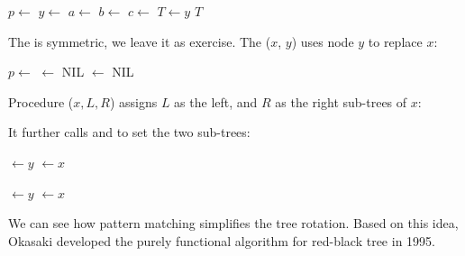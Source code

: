 \documentclass[b5paper]{article}
\begin{document}
\begin{algorithmic}[1]
  \State $p \gets$ 
  \State $y \gets$  
  \State $a \gets$ 
  \State $b \gets$ 
  \State $c \gets$ 
  \State {}  
  \State {} 
  \State {} 
    
    \State $T \gets y$
  \EndIf
  \State \Return $T$
\EndFunction
\end{algorithmic}

The  is symmetric, we leave it as exercise. The ($x$, $y$) uses node $y$ to replace $x$:

\begin{algorithmic}[1]
  \State $p \gets$ 
   
            $\gets$ NIL
    \EndIf
    \State {}
  \Else
    \State {}
  \EndIf
  \State {} $\gets$ NIL
\EndFunction
\end{algorithmic}

Procedure ($x, L, R$) assigns $L$ as the left, and $R$ as the right sub-trees of $x$:

\begin{algorithmic}[1]
  \State {}
  \State {}
\EndFunction
\end{algorithmic}

It further calls  and  to set the two sub-trees:

\begin{algorithmic}[1]
  \State {} $\gets y$
     $\gets x$
  \EndIf
  \EndFunction

\Statex

  \State {} $\gets y$
     $\gets x$
  \EndIf
\EndFunction
\end{algorithmic}

We can see how pattern matching simplifies the tree rotation. Based on this idea, Okasaki developed the purely functional algorithm for red-black tree in 1995\cite{okasaki}.
\end{document}
